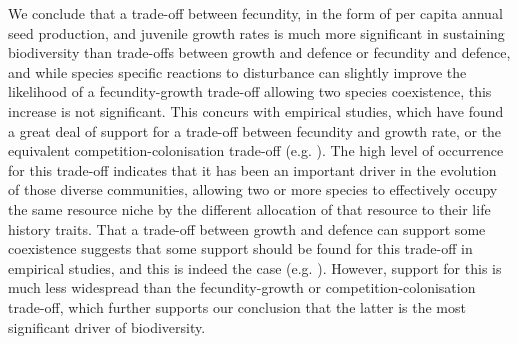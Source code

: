 \documentclass[preprint,10pt,reqno]{amsart}
\begin{document}
We conclude that a trade-off between fecundity, in the form of per capita annual seed production, and juvenile growth rates is much more significant in sustaining biodiversity than trade-offs between growth and defence or fecundity and defence, and while species specific reactions to disturbance can slightly improve the likelihood of a fecundity-growth trade-off allowing two species coexistence, this increase is not significant. This concurs with empirical studies, which have found a great deal of support for a trade-off between fecundity and growth rate, or the equivalent competition-colonisation trade-off (e.g. \cite{levins1971regional,yu2001competition,tilman1994competition,adler2000space}). The high level of occurrence for this trade-off indicates that it has been an important driver in the evolution of those diverse communities, allowing two or more species to effectively occupy the same resource niche by the different allocation of that resource to their life history traits. That a trade-off between growth and defence can support some coexistence suggests that some support should be found for this trade-off in empirical studies, and this is indeed the case (e.g. \cite{wright2010functional,fine2006growth}). However, support for this is much less widespread than the fecundity-growth or competition-colonisation trade-off, which further supports our conclusion that the latter is the most significant driver of biodiversity.



\end{document}
